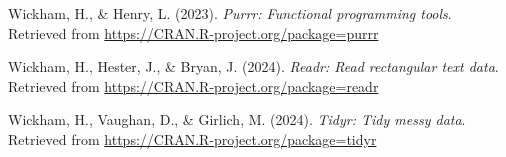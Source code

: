 \documentclass[
  man,floatsintext]{apa6}
\newlength{\cslhangindent}
\newenvironment{CSLReferences}[2] %
 {\begin{list}{}{%
  \setlength{\itemindent}{0pt}
  \setlength{\leftmargin}{0pt}
  \setlength{\parsep}{0pt}
  \ifodd #1
   \setlength{\leftmargin}{\cslhangindent}
   \setlength{\itemindent}{-1\cslhangindent}
  \fi
  \setlength{\itemsep}{#2\baselineskip}}}
 {\end{list}}
\begin{document}
\begin{CSLReferences}{1}{0}
Wickham, H., \& Henry, L. (2023). \emph{Purrr: Functional programming tools}. Retrieved from \url{https://CRAN.R-project.org/package=purrr}

Wickham, H., Hester, J., \& Bryan, J. (2024). \emph{Readr: Read rectangular text data}. Retrieved from \url{https://CRAN.R-project.org/package=readr}

Wickham, H., Vaughan, D., \& Girlich, M. (2024). \emph{Tidyr: Tidy messy data}. Retrieved from \url{https://CRAN.R-project.org/package=tidyr}

\end{CSLReferences}
\end{document}
